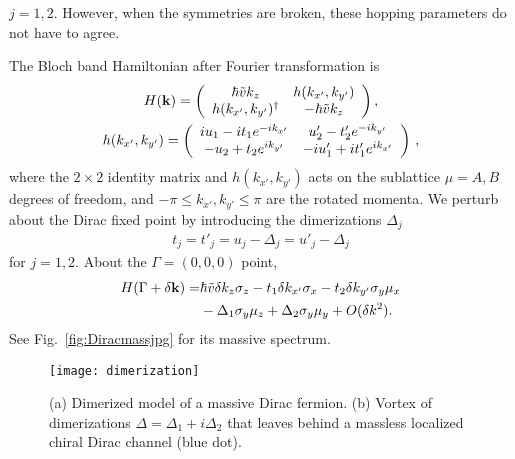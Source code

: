 $j=1,2$. However, when the symmetries are broken, these hopping parameters do not have to agree.

The Bloch band Hamiltonian after Fourier transformation is \begin{gather}H({\bf k})=\left(\begin{array}{*{20}c}\hbar\tilde{v}k_z&h(k_{x'},k_{y'})\\h(k_{x'},k_{y'})^\dagger&-\hbar\tilde{v}k_z\end{array}\right),\label{DiracBloch}\\h(k_{x'},k_{y'})=\left(\begin{array}{*{20}c}iu_1-it_1e^{-ik_{x'}}&u'_2-t'_2e^{-ik_{y'}}\\-u_2+t_2e^{ik_{y'}}&-iu'_1+it'_1e^{ik_{x'}}\end{array}\right)\nonumber \,, \end{gather} where the $2\times2$ identity matrix and $h(k_{x'},k_{y'})$ acts on the sublattice $\mu=A,B$ degrees of freedom, and $-\pi\leq k_{x'},k_{y'}\leq\pi$ are the rotated momenta. We perturb about the Dirac fixed point by introducing the dimerizations $\Delta_j$ \begin{align}t_j=t'_j=u_j-\Delta_j=u'_j-\Delta_j\end{align} for $j=1,2$. About the $\Gamma=(0,0,0)$ point, \begin{align}H(\Gamma+\delta{\bf k})=&\hbar\tilde{v}\delta k_z\sigma_z-t_1\delta k_{x'}\sigma_x-t_2\delta k_{y'}\sigma_y\mu_x\nonumber\\&-\Delta_1\sigma_y\mu_z+\Delta_2\sigma_y\mu_y+O(\delta k^2).\label{DiracHamwire}\end{align} See Fig.~\ref{fig:Diracmassjpg} for its massive spectrum.

\begin{figure}[htbp]
	\centering\texttt{[image: dimerization]}
	\caption[(a) Dimerized model of a massive Dirac fermion. (b) Vortex of dimerizations.]{(a) Dimerized model of a massive Dirac fermion. (b) Vortex of dimerizations $\Delta=\Delta_1+i\Delta_2$ that leaves behind a massless localized chiral Dirac channel (blue dot).}\label{fig:dimerization}
\end{figure}

